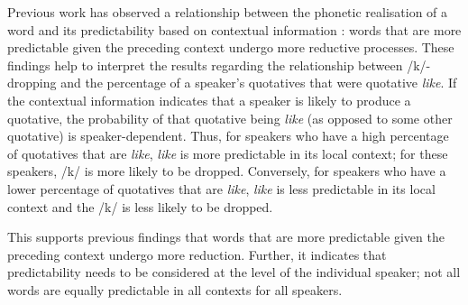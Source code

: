 


Previous work has observed a relationship between the phonetic realisation of a word and its predictability based on contextual information \citep{jurafskyetal2002}: words that are more predictable given the preceding context undergo more reductive processes. These findings help to interpret the results regarding the relationship between /k/-dropping and the percentage of a speaker's quotatives that were quotative \textit{like}. If the contextual information indicates that a speaker is likely to produce a quotative, the probability of that quotative being \textit{like} (as opposed to some other quotative) is speaker-dependent. Thus, for speakers who have a high percentage of quotatives that are \textit{like}, \textit{like} is more predictable in its local context; for these speakers, /k/ is more likely to be dropped. Conversely, for speakers who have a lower percentage of quotatives that are \textit{like}, \textit{like} is less predictable in its local context and the /k/ is less likely to be dropped.

This supports previous findings that words that are more predictable given the preceding context undergo more reduction. Further, it indicates that predictability needs to be considered at the level of the individual speaker; not all words are equally predictable in all contexts for all speakers.


